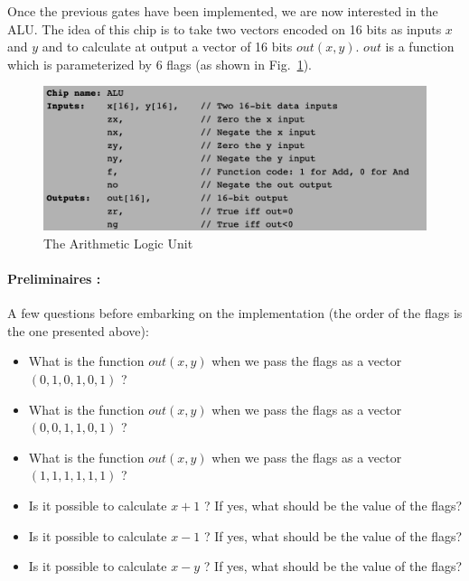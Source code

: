 \documentclass[11pt]{article}
\begin{document}
Once the previous gates have been implemented, we are now interested in the ALU. The idea of this chip is to take two vectors encoded on 16 bits as inputs \(x\)  and \(y\) and to calculate at output a vector of 16 bits  \(out(x,y)\).  \(out\) is a function which is parameterized by \(6\) flags (as shown in  Fig.~\ref{fig:alu}).

\begin{figure}[h!]
	\centering
	\label{fig:alu}
	\includegraphics[scale=0.8]{pictures/alu-inp-oup.png}
	\caption{The Arithmetic Logic Unit}
\end{figure}


\paragraph{Preliminaires :} A few questions before embarking on the implementation (the order of the flags is the one presented above):
\begin{itemize}
\item What is the function \(out(x,y)\) when we pass the flags as a vector \((0,1,0,1,0,1)\) ?
\item What is the function \(out(x,y)\) when we pass the flags as a vector \((0,0,1,1,0,1)\) ?
\item What is the function \(out(x,y)\) when we pass the flags as a vector \((1,1,1,1,1,1)\) ?
\item Is it possible to calculate \(x+1\) ? If yes, what should be the value of the flags?
\item Is it possible to calculate \(x-1\) ? If yes, what should be the value of the flags?
\item Is it possible to calculate \(x-y\) ? If yes, what should be the value of the flags?
\end{itemize}

%
\end{document}

